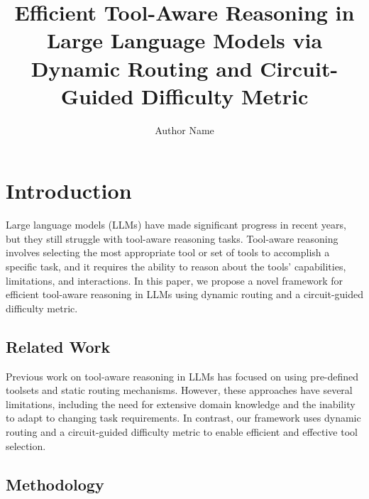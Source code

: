 \documentclass{article}
\begin{document}
\title{Efficient Tool-Aware Reasoning in Large Language Models via Dynamic Routing and Circuit-Guided Difficulty Metric}

\author{Author Name}

\maketitle


\section{Introduction}

Large language models (LLMs) have made significant progress in recent years, but they still struggle with tool-aware reasoning tasks. Tool-aware reasoning involves selecting the most appropriate tool or set of tools to accomplish a specific task, and it requires the ability to reason about the tools' capabilities, limitations, and interactions. In this paper, we propose a novel framework for efficient tool-aware reasoning in LLMs using dynamic routing and a circuit-guided difficulty metric.

\subsection{Related Work}

Previous work on tool-aware reasoning in LLMs has focused on using pre-defined toolsets and static routing mechanisms. However, these approaches have several limitations, including the need for extensive domain knowledge and the inability to adapt to changing task requirements. In contrast, our framework uses dynamic routing and a circuit-guided difficulty metric to enable efficient and effective tool selection.

\subsection{Methodology}
\end{document}
